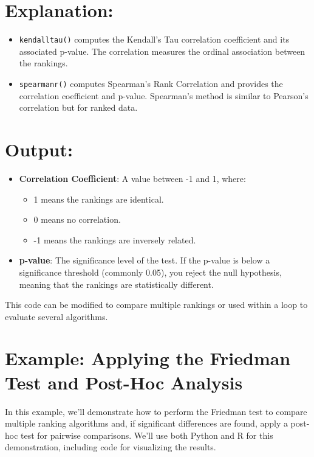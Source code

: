 \documentclass{article}
\begin{document}
\section*{Explanation:}
\begin{itemize}
    \item \texttt{kendalltau()} computes the Kendall's Tau correlation coefficient and its associated p-value. The correlation measures the ordinal association between the rankings.
    \item \texttt{spearmanr()} computes Spearman’s Rank Correlation and provides the correlation coefficient and p-value. Spearman’s method is similar to Pearson’s correlation but for ranked data.
\end{itemize}

\section*{Output:}
\begin{itemize}
    \item \textbf{Correlation Coefficient}: A value between -1 and 1, where:
    \begin{itemize}
        \item 1 means the rankings are identical.
        \item 0 means no correlation.
        \item -1 means the rankings are inversely related.
    \end{itemize}
    \item \textbf{p-value}: The significance level of the test. If the p-value is below a significance threshold (commonly 0.05), you reject the null hypothesis, meaning that the rankings are statistically different.
\end{itemize}

This code can be modified to compare multiple rankings or used within a loop to evaluate several algorithms. 

\section*{Example: Applying the Friedman Test and Post-Hoc Analysis}

In this example, we'll demonstrate how to perform the Friedman test to compare multiple ranking algorithms and, if significant differences are found, apply a post-hoc test for pairwise comparisons. We'll use both Python and R for this demonstration, including code for visualizing the results.
\end{document}
